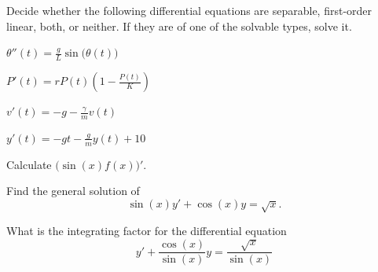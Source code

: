 \begin{lesson}

%	
%
%	

\end{lesson}





\question 
	Decide whether the following differential equations are separable, first-order linear, both, or neither. If they are of one of the solvable types, solve it.

\begin{parts}
	\item $\displaystyle\theta''(t) = \frac{g}{L} \sin\big(\theta(t)\big)$
	\item $\displaystyle P'(t) = r P(t) \left( 1 - \frac{P(t)}{K} \right)$
	\item $\displaystyle v'(t) = -g - \frac{\gamma}{m} v(t)$
	\item $\displaystyle y'(t) = -gt - \frac{g}{m} y(t) + 10$
\end{parts}











\bookonlynewpage




\question
\begin{parts}
	\item Calculate $\big( \sin(x) f(x) \big)'$.
	\item Find the general solution of 
		$$ \sin(x) y' + \cos(x) y = \sqrt{x}.$$
	\item What is the integrating factor for the differential equation
		$$ y' + \frac{\cos(x)}{\sin(x)} y = \frac{\sqrt{x}}{\sin(x)}$$
\end{parts}




